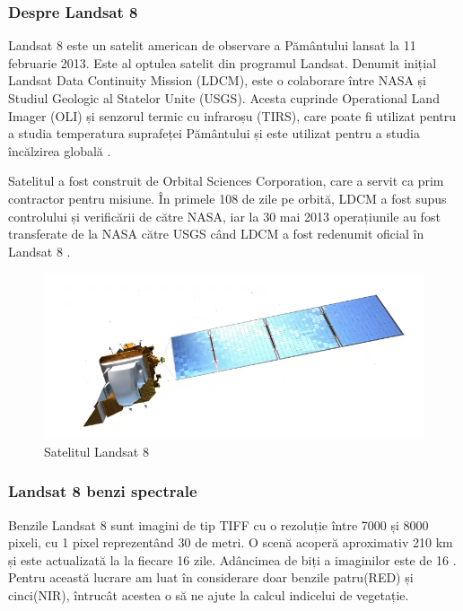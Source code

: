 \documentclass[12pt,a4paper]{article}
\theoremstyle{definition}
\theoremstyle{remark}
\begin{document}
\subsubsection{Despre Landsat 8}


Landsat 8 este un satelit american de observare a Pământului lansat la 11 februarie 2013. Este al optulea satelit din programul Landsat. Denumit inițial Landsat Data Continuity Mission (LDCM), este o colaborare între NASA și Studiul Geologic al Statelor Unite (USGS).  Acesta cuprinde Operational Land Imager (OLI) și senzorul termic cu infraroșu (TIRS), care poate fi utilizat pentru a studia temperatura suprafeței Pământului și este utilizat pentru a studia încălzirea globală \cite{ladsat}.

Satelitul a fost construit de Orbital Sciences Corporation, care a servit ca prim contractor pentru misiune. În primele 108 de zile pe orbită, LDCM a fost supus controlului și verificării de către NASA, iar la 30 mai 2013 operațiunile au fost transferate de la NASA către USGS când LDCM a fost redenumit oficial în Landsat 8 \cite{ladsat}.

\begin{figure}[H]
  \centering
  \includegraphics[width=400pt]{LANDSAT8.PNG}
  \caption{Satelitul Landsat 8 \cite{landsat8} }   
\end{figure}
\subsubsection{Landsat 8 benzi spectrale}


Benzile Landsat 8 sunt imagini de tip TIFF cu o rezoluție între 7000 și 8000 pixeli,
cu 1 pixel reprezentând 30 de metri. O scenă acoperă aproximativ 210 km și este actualizată la
la fiecare 16 zile. Adâncimea de biți a imaginilor este de 16 . Pentru această lucrare am luat în considerare doar benzile patru(RED) și cinci(NIR), întrucât acestea o să ne ajute la calcul indicelui de vegetație.
\end{document}
